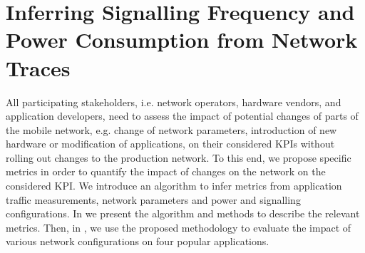 \section{Inferring Signalling Frequency and Power Consumption from Network Traces}\label{sec:network:network_traces}
All participating stakeholders, i.e. network operators, hardware vendors, and application developers, need to assess the impact of potential changes of parts of the mobile network, e.g. change of network parameters, introduction of new hardware or modification of applications, on their considered \glspl{KPI} without rolling out changes to the production network.
To this end, we propose specific metrics in order to quantify the impact of changes on the network on the considered \gls{KPI}.
We introduce an algorithm to infer metrics from application traffic measurements, network parameters and power and signalling configurations.
In  we present the algorithm and methods to describe the relevant metrics.
Then, in , we use the proposed methodology to evaluate the impact of various network configurations on four popular applications.



